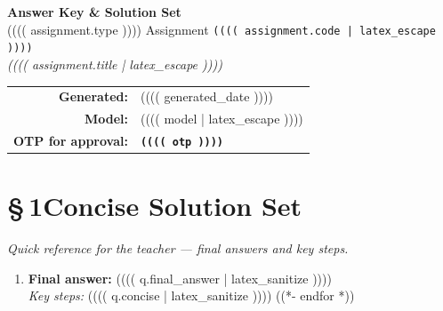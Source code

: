 \documentclass[11pt,a4paper]{article}
\begin{document}
\begin{tcolorbox}[
  colback=headerBlue!8, colframe=headerBlue,
  arc=4pt, boxrule=1pt,
  left=8pt, right=8pt, top=6pt, bottom=6pt
]
\begin{center}
  {\Large\bfseries\color{headerBlue} Answer Key \& Solution Set} \\[4pt]
  {\large\color{accentGold}
    (((( assignment.type )))) Assignment \textbullet{} \texttt{(((( assignment.code | latex_escape ))))}
  } \\[4pt]
  \small\textit{(((( assignment.title | latex_escape ))))} \\[4pt]
  \begin{tabular}{rl}
    \textbf{Generated:} & (((( generated_date )))) \\
    \textbf{Model:}     & (((( model | latex_escape )))) \\
    \textbf{OTP for approval:} & \texttt{\textbf{(((( otp ))))}} \\
  \end{tabular}
\end{center}
\end{tcolorbox}

\vspace{1em}

\section*{\color{conciseGreen}\S\,1\quad Concise Solution Set}
\textit{Quick reference for the teacher --- final answers and key steps.}

\vspace{0.5em}

\begin{tcolorbox}[
  colback=conciseGreen!5, colframe=conciseGreen,
  arc=3pt, boxrule=0.7pt,
  left=8pt, right=8pt, breakable
]
\begin{enumerate}[leftmargin=2.2em, label={\bfseries Q\arabic*.}]
((*- for q in questions *))
  \item \textbf{Final answer:} (((( q.final_answer | latex_sanitize ))))
  \\[2pt]
  \textit{Key steps:} (((( q.concise | latex_sanitize ))))
((*- endfor *))
\end{enumerate}
\end{tcolorbox}

\vspace{1.2em}
\end{document}

